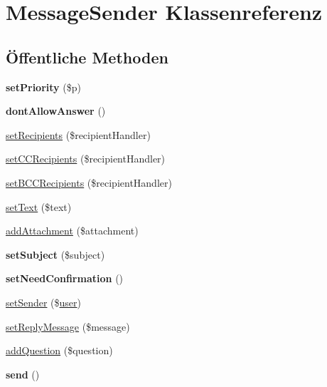 \hypertarget{class_message_sender}{}\section{Message\+Sender Klassenreferenz}
\label{class_message_sender}
\subsection*{Öffentliche Methoden}
\begin{DoxyCompactItemize}
\item 
\mbox{\label{class_message_sender_a7e540e6abd9208ab4defacaf21b0ff6b}} 
{\bfseries set\+Priority} (\$p)
\item 
\mbox{\label{class_message_sender_a1bba622b49b6fd240a7cf7abd139b396}} 
{\bfseries dont\+Allow\+Answer} ()
\item 
\mbox{\hyperlink{class_message_sender_a8e4fe082de4123d362a3383c89909bfb}{set\+Recipients}} (\$recipient\+Handler)
\item 
\mbox{\hyperlink{class_message_sender_a422c8b50ea682b7adf5c33037c797f4e}{set\+C\+C\+Recipients}} (\$recipient\+Handler)
\item 
\mbox{\hyperlink{class_message_sender_ad3f2d2dfa82307010189fd9f58c7966b}{set\+B\+C\+C\+Recipients}} (\$recipient\+Handler)
\item 
\mbox{\hyperlink{class_message_sender_aa60a0f3ce0726af9c1d4b172eb54a1e3}{set\+Text}} (\$text)
\item 
\mbox{\hyperlink{class_message_sender_a97fe86bda23bda7295fcaa9025be1ba9}{add\+Attachment}} (\$attachment)
\item 
\mbox{\label{class_message_sender_a2e43187bbf6fe060dd6e4d0d715ef726}} 
{\bfseries set\+Subject} (\$subject)
\item 
\mbox{\label{class_message_sender_ac0da9692c92f3caba115e18a4eaaceec}} 
{\bfseries set\+Need\+Confirmation} ()
\item 
\mbox{\hyperlink{class_message_sender_a0e835d4405f4cf0c4e7d46dc91e11126}{set\+Sender}} (\$\mbox{\hyperlink{classuser}{user}})
\item 
\mbox{\hyperlink{class_message_sender_a3f3faae1f609bd6838188eb669894c66}{set\+Reply\+Message}} (\$message)
\item 
\mbox{\hyperlink{class_message_sender_a53226a6ca85406bf39751d9296bc622e}{add\+Question}} (\$question)
\item 
\mbox{\label{class_message_sender_aee96212539da5e8e5560f057d37df45e}} 
{\bfseries send} ()
\end{DoxyCompactItemize}


